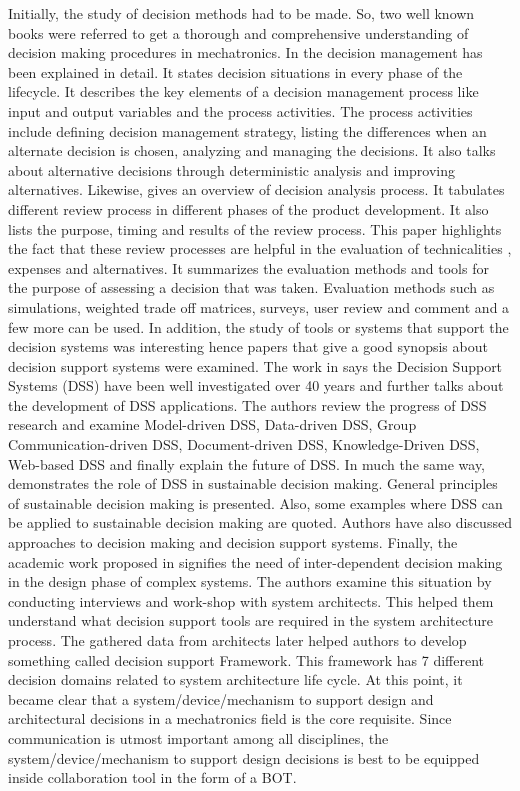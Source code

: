 Initially, the study of decision methods had to be made. So, two well known books were referred to get a thorough and comprehensive understanding of decision making procedures in mechatronics. In \cite{walden2015} the decision management has been explained in detail. It states decision situations in every phase of the lifecycle. It describes the key elements of a decision management process like input and output variables and the process activities. The process activities include defining decision management strategy, listing the differences when an alternate decision is chosen, analyzing and managing the decisions. It also talks about alternative decisions through deterministic analysis and improving alternatives. Likewise, \cite{irshorn2007} gives an overview of decision analysis process. It tabulates different review process in different phases of the product development. It also lists the purpose, timing and results of the review process.
This paper highlights the fact that these review processes are helpful in the evaluation of technicalities , expenses and alternatives. It summarizes the evaluation methods and tools for the purpose of assessing a decision that was taken. Evaluation methods such as simulations, weighted trade off matrices, surveys, user review and comment and a few more can be used. In addition, the study of tools or systems that support the decision systems was interesting hence papers that give a good synopsis about decision support systems were examined. The work in \cite{chai_zhengmeng_brief_2011} says the Decision Support Systems (DSS) have been well investigated over 40 years and further talks about the development of DSS applications. The authors review the progress of DSS research and examine Model-driven DSS, Data-driven DSS, Group Communication-driven DSS, Document-driven DSS, Knowledge-Driven DSS, Web-based DSS and finally explain the future of DSS. In much the same way, \cite{hersh_sustainable_1999} demonstrates the role of DSS in sustainable decision making. General principles of sustainable decision making is presented. Also, some examples where DSS can be applied to sustainable decision making are quoted. Authors have also discussed approaches to decision making and decision support systems. Finally, the academic work proposed in \cite{hamida_towards_nodate} signifies the need of inter-dependent decision making in the design phase of complex systems. The authors examine this situation by conducting interviews and work-shop with system architects. This helped them understand what decision support tools are required in the system architecture process. The gathered data from architects later helped authors to develop something called decision support Framework. This framework has 7 different decision domains related to system architecture life cycle. At this point, it became clear that a system/device/mechanism to support design and architectural decisions in a mechatronics field is the core requisite. Since communication is utmost important among all disciplines, the system/device/mechanism to support design decisions is best to be equipped inside collaboration tool in the form of a BOT.  

